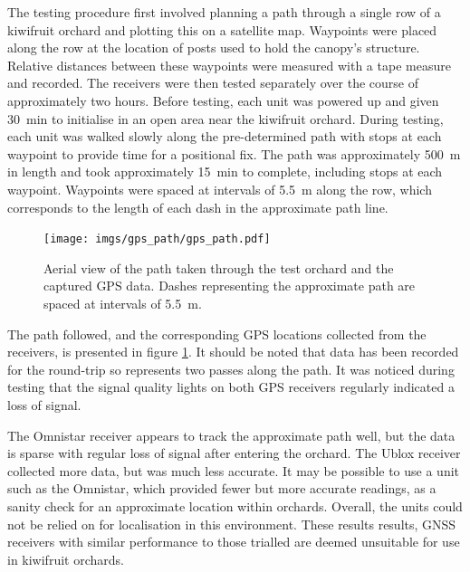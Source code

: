 \documentclass[preprint,authoryear,12pt]{elsarticle}
\begin{document}
        The testing procedure first involved planning a path through a single row of a kiwifruit orchard and plotting this on a satellite map.
        Waypoints were placed along the row at the location of posts used to hold the canopy's structure.
        Relative distances between these waypoints were measured with a tape measure and recorded.
        The receivers were then tested separately over the course of approximately two hours.
        Before testing, each unit was powered up and given \SI{30}{\minute} to initialise in an open area near the kiwifruit orchard.
        During testing, each unit was walked slowly along the pre-determined path with stops at each waypoint to provide time for a positional fix.
        The path was approximately \SI{500}{\meter} in length and took approximately \SI{15}{\minute} to complete, including stops at each waypoint.
        Waypoints were spaced at intervals of \SI{5.5}{\meter} along the row, which corresponds to the length of each dash in the approximate path line.

        \begin{figure}[htb]
            \centering
            \texttt{[image: imgs/gps\_path/gps\_path.pdf]}
            \caption{
                Aerial view of the path taken through the test orchard and the captured GPS data.
                Dashes representing the approximate path are spaced at intervals of \SI{5.5}{\meter}.
            }
            \label{fig:gpsResults}
        \end{figure}

        The path followed, and the corresponding GPS locations collected from the receivers, is presented in figure \ref{fig:gpsResults}.
        It should be noted that data has been recorded for the round-trip so represents two passes along the path.
        It was noticed during testing that the signal quality lights on both GPS receivers regularly indicated a loss of signal.

        The Omnistar receiver appears to track the approximate path well, but the data is sparse with regular loss of signal after entering the orchard.
    	The Ublox receiver collected more data, but was much less accurate.
        It may be possible to use a unit such as the Omnistar, which provided fewer but more accurate readings, as a sanity check for an approximate location within orchards.
        Overall, the units could not be relied on for localisation in this environment.
        These results results, GNSS receivers with similar performance to those trialled are deemed unsuitable for use in kiwifruit orchards.
\end{document}
